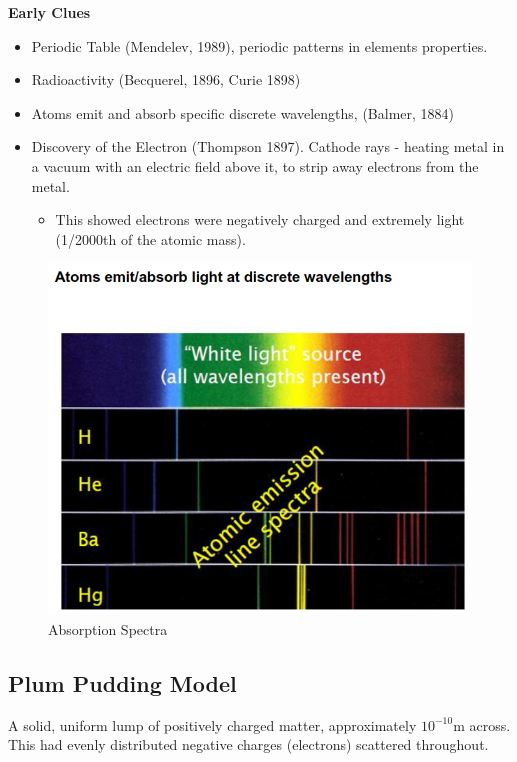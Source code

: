 \textbf{Early Clues}
\begin{itemize}
    \item Periodic Table (Mendelev, 1989), periodic patterns in elements properties.
    \item Radioactivity (Becquerel, 1896, Curie 1898)
    \item Atoms emit and absorb specific discrete wavelengths, (Balmer, 1884)
    \item Discovery of the Electron (Thompson 1897). Cathode rays - heating metal in a vacuum with an electric field above it, to strip away electrons from the metal.
    \begin{itemize}
        \item This showed electrons were negatively charged and extremely light (1/2000th of the atomic mass).
    \end{itemize}
\end{itemize}
\begin{figure}[H]
    \centering
    \includegraphics{figures/absorption_spectra.png}
     \caption{Absorption Spectra}
\end{figure}

\subsection*{Plum Pudding Model}
A solid, uniform lump of positively charged matter, approximately $10^{-10}$m across. This had evenly distributed negative charges (electrons) scattered throughout.

